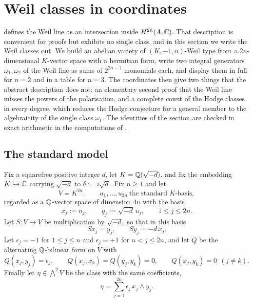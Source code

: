 \section{Weil classes in coordinates}\label{sec:explicit}

 defines the Weil line as an intersection inside
$H^{2n}(A,\mathbb{C})$. That description is convenient for proofs but exhibits no
single class, and in this section we write the Weil classes out. We build an
abelian variety of $(K,-1,n)$-Weil type from a $2n$-dimensional $K$-vector
space with a hermitian form, write two integral generators
$\omega_{1},\omega_{2}$ of the Weil line as sums of $2^{2n-1}$ monomials each,
and display them in full for $n=2$ and in a table for $n=3$. The coordinates
then give two things that the abstract description does not: an elementary
second proof that the Weil line misses the powers of the polarisation, and a
complete count of the Hodge classes in every degree, which reduces the Hodge
conjecture for a general member to the algebraicity of the single class
$\omega_{1}$. The identities of the section are checked in exact arithmetic
in the computations of \cite{BMB26}.

\subsection{The standard model}

\begin{setupenv}\label{setup:model}
Fix a squarefree positive integer $d$, let $K=\mathbb{Q}(\sqrt{-d})$, and fix the
embedding $K\hookrightarrow\mathbb{C}$ carrying $\sqrt{-d}$ to $\delta:=i\sqrt{d}$.
Fix $n\ge1$ and let
\[
  V=K^{2n},
  \qquad
  u_{1},\dots,u_{2n}\ \text{the standard $K$-basis},
\]
regarded as a $\mathbb{Q}$-vector space of dimension $4n$ with the basis
\[
  x_{j}:=u_{j},
  \qquad
  y_{j}:=\sqrt{-d}\,u_{j},
  \qquad 1\le j\le 2n .
\]
Let $S\colon V\to V$ be multiplication by $\sqrt{-d}$, so that in this basis
\begin{equation}\label{eq:Sbasis}
  S x_{j}=y_{j},
  \qquad
  S y_{j}=-d\,x_{j}.
\end{equation}
Let $\epsilon_{j}=-1$ for $1\le j\le n$ and $\epsilon_{j}=+1$ for
$n<j\le 2n$, and let $Q$ be the alternating $\mathbb{Q}$-bilinear form on $V$ with
\begin{equation}\label{eq:Qbasis}
  Q(x_{j},y_{j})=\epsilon_{j},
  \qquad
  Q(x_{j},x_{k})=Q(y_{j},y_{k})=0,
  \qquad
  Q(x_{j},y_{k})=0 \ \ (j\ne k).
\end{equation}
Finally let $\eta\in\bigwedge^{2}V$ be the class with the same coefficients,
\begin{equation}\label{eq:etabasis}
  \eta=\sum_{j=1}^{2n}\epsilon_{j}\,x_{j}\wedge y_{j}.
\end{equation}
\end{setupenv}

